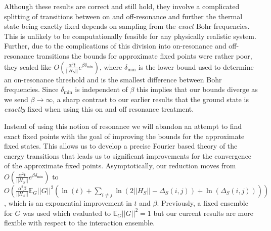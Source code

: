 \documentclass[
 amsmath,amssymb,
 aps,
onecolumn, 
nofootinbib]{revtex4-2}
\newcommand{\norm}[1]{\left|\left| #1 \right|\right|}
\newcommand{\EE}{\mathbb{E}}
\begin{document}
Although these results are correct and still hold, they involve a complicated splitting of transitions between on and off-resonance and further the thermal state being exactly fixed depends on sampling from the \emph{exact} Bohr frequencies. This is unlikely to be computationally feasible for any physically realistic system. Further, due to the complications of this division into on-resonance and off-resonance transitions the bounds for approximate fixed points were rather poor, they scaled like $O\left(\frac{\alpha^2 t}{\norm{H_S}} e^{\beta \delta_{\min}} \right)$, where $\delta_{\min}$ is the lower bound used to determine an on-resonance threshold and is the smallest difference between Bohr frequencies. Since $\delta_{\min}$ is independent of $\beta$ this implies that our bounds diverge as we send $\beta \to \infty$, a sharp contrast to our earlier results that the ground state is \emph{exactly} fixed when using this on and off resonance treatment.

Instead of using this notion of resonance we will abandon an attempt to find exact fixed points with the goal of improving the bounds for the approximate fixed states. This allows us to develop a precise Fourier based theory of the energy transitions that leads us to significant improvements for the convergence of the approximate fixed points. Asymptotically, our reduction moves from $O\left(\frac{\alpha^2 t}{\norm{H_S}} e^{\beta \delta_{\min}} \right)$ to $O(\frac{\alpha^2 \beta}{\norm{H_S}} \EE_G \norm{G}^2 (\ln (t) + \sum_{i \neq j} \ln (2 \norm{H_S} - \Delta_S(i,j)) + \ln (\Delta_S(i,j))) )$, which is an exponential improvement in $t$ and $\beta$. Previously, a fixed ensemble for $G$ was used which evaluated to $\EE_G \norm{G}^2 = 1$ but our current results are more flexible with respect to the interaction ensemble.  
\end{document}
